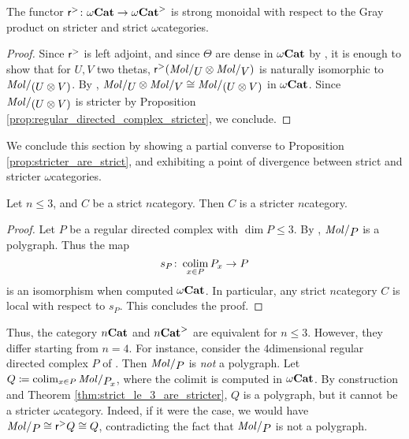 \begin{prop} \label{prop:reflection_to_stricter_monoidal}
    The functor \( \mathsf{r}^{>} \colon {\omega\mathbf{Cat}} \to {\omega\mathbf{Cat}}^> \) is strong monoidal with respect to the Gray product on stricter and strict \( \omega \)\nbd categories.
\end{prop}
\begin{proof}
    Since \( \mathsf{r}^{>} \) is left adjoint, and since \( \Theta \) are dense in \( {\omega\mathbf{Cat}} \) by \cite[Proposition 4.6]{ara2020joint}, it is enough to show that for \( U, V \) two thetas, \( \rcs (\molecin{U} \gray \molecin{V}) \) is naturally isomorphic to \( \molecin{(U \gray V)} \).
    By \cite[Lemma 9.1.16, Proposition 11.2.36]{hadzihasanovic2024combinatorics}, \( \molecin{U} \gray \molecin{V} \cong \molecin{(U \gray V)} \) in \( {\omega\mathbf{Cat}} \).
    Since \( \molecin{(U \gray V)} \) is stricter by Proposition \ref{prop:regular_directed_complex_stricter}, we conclude.
\end{proof}

\noindent We conclude this section by showing a partial converse to Proposition \ref{prop:stricter_are_strict}, and exhibiting a point of divergence between strict and stricter \( \omega \)\nbd categories.

\begin{thm}\label{thm:strict_le_3_are_stricter}
    Let \( n \le 3 \), and \( C \) be a strict \( n \)\nbd category.
    Then \( C \) is a stricter \( n \)\nbd category.
\end{thm}
\begin{proof}
    Let \( P \) be a regular directed complex with \( \dim P \le 3 \).
    By \cite[Corollary 8.4.12]{hadzihasanovic2024combinatorics}, \( \molecin{P} \) is a polygraph.
    Thus the map
    \begin{equation*}
        s_P \colon \operatorname*{colim}_{x \in P} {P}_{x} \to P 
    \end{equation*}
    is an isomorphism when computed \( {\omega\mathbf{Cat}} \).
    In particular, any strict \( n \)\nbd category \( C \) is local with respect to \( s_P \).
    This concludes the proof.
\end{proof}

\begin{comm} \label{comm:strict_are_not_stricter}
    Thus, the category \( {n\mathbf{Cat}} \) and \( {n\mathbf{Cat}}^> \) are equivalent for \( n \le 3 \).
    However, they differ starting from \( n = 4 \).
    For instance, consider the \( 4 \)\nbd dimensional regular directed complex \( P \) of \cite[Example 8.2.20]{hadzihasanovic2024combinatorics}.
    Then \( \molecin{P} \) is \emph{not} a polygraph.
    Let \( Q \eqdef \colim_{x \in P} \molecin{\imel{P}{x}} \), where the colimit is computed in \( {\omega\mathbf{Cat}} \).
    By construction and Theorem \ref{thm:strict_le_3_are_stricter}, \( Q \) is a polygraph, but it cannot be a stricter \( \omega \)\nbd category.
    Indeed, if it were the case, we would have \( \molecin{P} \cong \rcs Q \cong Q \), contradicting the fact that \( \molecin{P} \) is not a polygraph.
\end{comm}

